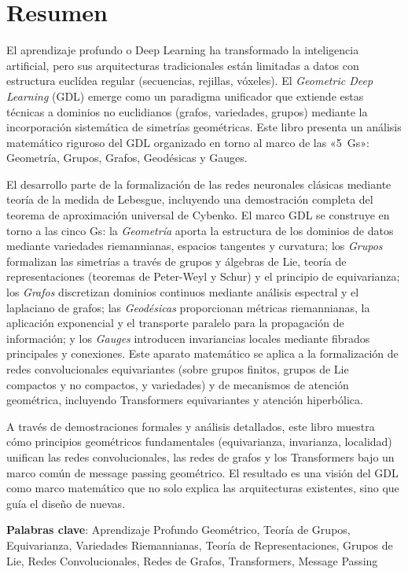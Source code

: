 \chapter*{Resumen}

El aprendizaje profundo o Deep Learning ha transformado la inteligencia artificial, pero sus arquitecturas tradicionales están limitadas a datos con estructura euclídea regular (secuencias, rejillas, vóxeles). El \emph{Geometric Deep Learning} (GDL) emerge como un paradigma unificador que extiende estas técnicas a dominios no euclidianos (grafos, variedades, grupos) mediante la incorporación sistemática de simetrías geométricas. Este libro presenta un análisis matemático riguroso del GDL organizado en torno al marco de las «5~Gs»: Geometría, Grupos, Grafos, Geodésicas y Gauges.

El desarrollo parte de la formalización de las redes neuronales clásicas mediante teoría de la medida de Lebesgue, incluyendo una demostración completa del teorema de aproximación universal de Cybenko. El marco GDL se construye en torno a las cinco Gs: la \emph{Geometría} aporta la estructura de los dominios de datos mediante variedades riemannianas, espacios tangentes y curvatura; los \emph{Grupos} formalizan las simetrías a través de grupos y álgebras de Lie, teoría de representaciones (teoremas de Peter-Weyl y Schur) y el principio de equivarianza; los \emph{Grafos} discretizan dominios continuos mediante análisis espectral y el laplaciano de grafos; las \emph{Geodésicas} proporcionan métricas riemannianas, la aplicación exponencial y el transporte paralelo para la propagación de información; y los \emph{Gauges} introducen invariancias locales mediante fibrados principales y conexiones. Este aparato matemático se aplica a la formalización de redes convolucionales equivariantes (sobre grupos finitos, grupos de Lie compactos y no compactos, y variedades) y de mecanismos de atención geométrica, incluyendo Transformers equivariantes y atención hiperbólica.

A través de demostraciones formales y análisis detallados, este libro muestra cómo principios geométricos fundamentales (equivarianza, invarianza, localidad) unifican las redes convolucionales, las redes de grafos y los Transformers bajo un marco común de message passing geométrico. El resultado es una visión del GDL como marco matemático que no solo explica las arquitecturas existentes, sino que guía el diseño de nuevas.

\vspace{0.5cm}
\begin{flushleft}
	\textbf{Palabras clave}: Aprendizaje Profundo Geométrico, Teoría de Grupos, Equivarianza, Variedades Riemannianas, Teoría de Representaciones, Grupos de Lie, Redes Convolucionales, Redes de Grafos, Transformers, Message Passing
\end{flushleft}
